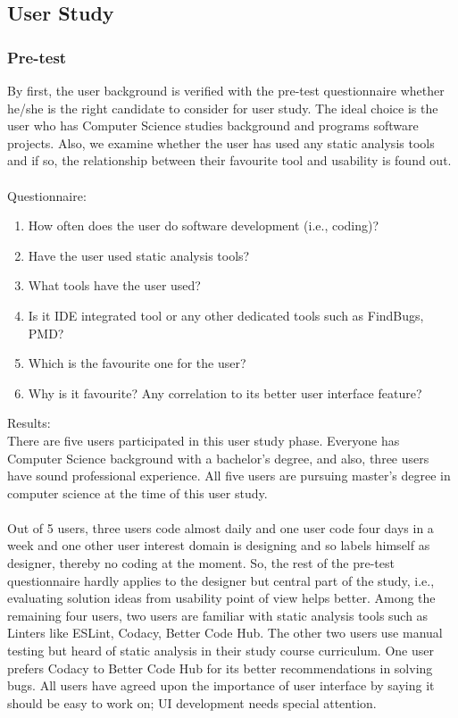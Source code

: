 \subsection{User Study}

\subsubsection{Pre-test}

By first, the user background is verified with the pre-test questionnaire whether he/she is the right candidate to consider for user study. The ideal choice is the user who has Computer Science studies background and programs software projects. Also, we examine whether the user has used any static analysis tools and if so, the relationship between their favourite tool and usability is found out. \\ \\

Questionnaire: \\

\begin{enumerate}
\item How often does the user do software development (i.e., coding)?
\item Have the user used static analysis tools?
\item What tools have the user used?
\item Is it IDE integrated tool or any other dedicated tools such as FindBugs, PMD?
\item Which is the favourite one for the user?  
\item Why is it favourite? Any correlation to its better user interface feature?
\end{enumerate}

Results: \\

There are five users participated in this user study phase. Everyone has Computer Science background with a bachelor’s degree, and also, three users have sound professional experience. All five users are pursuing master’s degree in computer science at the time of this user study. \\ \\

Out of 5 users, three users code almost daily and one user code four days in a week and one other user interest domain is designing and so labels himself as designer, thereby no coding at the moment. So, the rest of the pre-test questionnaire hardly applies to the designer but central part of the study, i.e., evaluating solution ideas from usability point of view helps better. Among the remaining four users, two users are familiar with static analysis tools such as Linters like ESLint, Codacy, Better Code Hub. The other two users use manual testing but heard of static analysis in their study course curriculum. One user prefers Codacy to Better Code Hub for its better recommendations in solving bugs. All users have agreed upon the importance of user interface by saying it should be easy to work on;  UI development needs special attention.\\ \\


